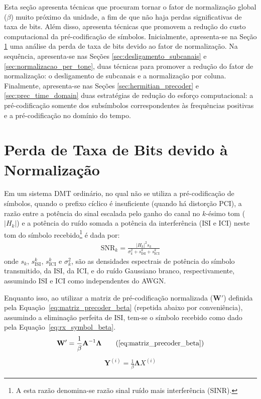 Esta seção apresenta técnicas que procuram tornar o fator de normalização global ($\beta$) muito próximo da unidade, a fim de que não haja perdas significativas de taxa de bits. Além disso, apresenta técnicas que promovem a redução do custo computacional da pré-codificação de símbolos.  Inicialmente, apresenta-se na Seção \ref{sec:perda_taxa} uma análise da perda de taxa de bits devido ao fator de normalização. Na sequência, apresenta-se nas Seções \ref{sec:desligamento_subcanais} e \ref{sec:normalizacao_per_tone}, duas técnicas para promover  a redução do fator de normalização: o desligamento de subcanais e a normalização por coluna. Finalmente, apresenta-se nas Seções \ref{sec:hermitian_precoder} e \ref{sec:prec_time_domain} duas estratégias de redução do esforço computacional: a pré-codificação somente dos subsímbolos correspondentes às frequências positivas e a pré-codificação no domínio do tempo.

\section{Perda de Taxa de Bits devido à Normalização}
\label{sec:perda_taxa}

Em um sistema DMT ordinário, no qual não se utiliza a pré-codificação de símbolos, quando o prefixo cíclico é insuficiente (quando há distorção PCI), a razão entre a potência do sinal escalada pelo ganho do canal no $k$-ésimo tom ($\left| H_k \right|$) e a potência do ruído somada a potência da interferência (ISI e ICI) neste tom do símbolo recebido\footnote{A esta razão denomina-se razão sinal ruído mais interferência (SINR).} é dada por:
\begin{align}
\text{SNR}_k = \frac{ \left|H_k \right|^2 s_k }{ \sigma_k^2 + s_\text{ISI}^k + s_\text{ICI}^k }
\label{eq:sinr_rx_symbol}
\end{align}
onde  $s_k$, $s_\text{ISI}^k$, $s_\text{ICI}^k$ e $\sigma_k^2$, são as densidades espectrais de potência do símbolo transmitido, da ISI, da ICI, e do ruído Gaussiano branco, respectivamente, assumindo ISI e ICI como independentes do AWGN.

Enquanto isso, ao utilizar a matriz de pré-codificação normalizada ($\mathbf{W}'$) definida pela Equação~\ref{eq:matriz_precoder_beta} (repetida abaixo por conveniência), assumindo a eliminação perfeita de ISI, tem-se o símbolo recebido como dado pela Equação~\ref{eq:rx_symbol_beta}.
\begin{align}
\mathbf{W}' =  \frac{1}{\beta}\mathbf{A}^{-1}\mathbf{\Lambda}
\tag{\ref{eq:matriz_precoder_beta}}
\end{align}
\begin{align}
\mathbf{Y}^{(i)} =\frac{1}{\beta}\mathbf{\Lambda} X^{(i)}
\label{eq:rx_symbol_beta}
\end{align}

